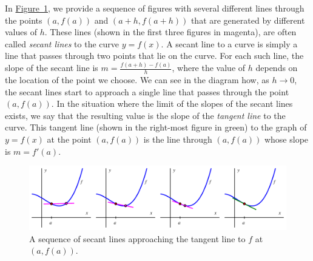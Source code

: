 \documentclass[10pt,]{book}
\theoremstyle{plain}
\theoremstyle{definition}
\theoremstyle{definition}
\theoremstyle{definition}
\theoremstyle{definition}
\theoremstyle{definition}
\numberwithin{equation}{section}
\begin{document}
In \hyperref[F-1-3-SecToTanSeq]{Figure~\ref{F-1-3-SecToTanSeq}}, we provide a sequence of figures with several different lines through the points \((a, f(a))\) and \((a+h,f(a+h))\) that are generated by different values of \(h\). These lines (shown in the first three figures in magenta), are often called \emph{secant lines} \index{} to the curve \(y = f(x)\). A secant line to a curve is simply a line that passes through two points that lie on the curve. For each such line, the slope of the secant line is \(m = \frac{f(a+h) - f(a)}{h}\), where the value of \(h\) depends on the location of the point we choose. We can see in the diagram how, as \(h \to 0\), the secant lines start to approach a single line that passes through the point \((a,f(a))\). In the situation where the limit of the slopes of the secant lines exists, we say that the resulting value is the slope of the \emph{tangent line} to the curve. This tangent line\index{} (shown in the right-most figure in green) to the graph of \(y = f(x)\) at the point \((a,f(a))\) is the line through \((a,f(a))\) whose slope is \(m = f'(a)\).
%
\leavevmode%
\begin{figure}
\centering
\includegraphics[width=1\linewidth]{images/1_3_SecToTanSeq}
\caption{A sequence of secant lines approaching the tangent line to \(f\) at \((a,f(a))\).\label{F-1-3-SecToTanSeq}}
\end{figure}
\par
\end{document}
